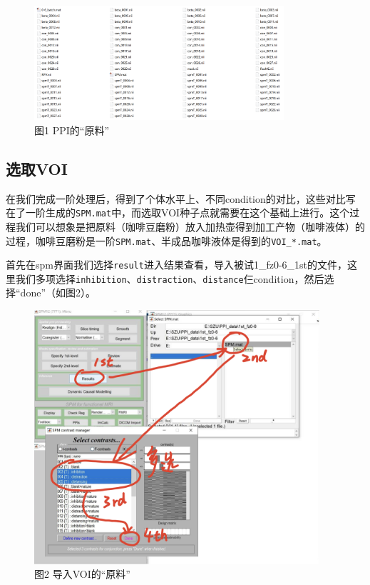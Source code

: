 \documentclass[
]{article}
\begin{document}
\begin{figure}
\centering
\includegraphics[width=3.64583in,height=\textheight]{prepared_1st.png}
\caption{图1 PPI的``原料''}
\end{figure}

\hypertarget{ux9009ux53d6voi}{%
\subsection{选取VOI}\label{ux9009ux53d6voi}}

在我们完成一阶处理后，得到了个体水平上、不同condition的对比，这些对比写在了一阶生成的\texttt{SPM.mat}中，而选取VOI种子点就需要在这个基础上进行。这个过程我们可以想象是把原料（咖啡豆磨粉）放入加热壶得到加工产物（咖啡液体）的过程，咖啡豆磨粉是一阶\texttt{SPM.mat}、半成品咖啡液体是得到的\texttt{VOI\_*.mat}。

首先在spm界面我们选择\texttt{result}进入结果查看，导入被试1\_fz0-6\_1st的文件，这里我们多项选择\texttt{inhibition}、\texttt{distraction}、\texttt{distance}仨condition，然后选择``done''（如图2）。

\begin{figure}
\centering
\includegraphics[width=4.16667in,height=\textheight]{VOI_1st_step.png}
\caption{图2 导入VOI的``原料''}
\end{figure}
\end{document}
